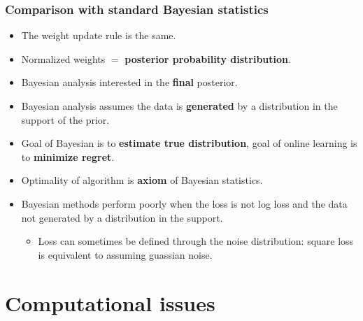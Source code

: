 \documentclass[handout]{beamer}
\begin{document}
\begin{frame}
\frametitle{Comparison with standard Bayesian statistics}
\begin{itemize}
\item The weight update rule is the same.
\item Normalized weights $=$ {\bf posterior probability  distribution}.
\item Bayesian analysis interested in the {\bf final} posterior.
\item Bayesian analysis assumes the data is {\bf generated} 
by a distribution in the support of the prior.
\item Goal of Bayesian is to {\bf estimate true distribution}, 
goal of online learning is to {\bf minimize regret}.
\item Optimality of algorithm is {\bf axiom} of Bayesian statistics.
\item Bayesian methods perform poorly when the loss is not log loss
  and the data not generated by a distribution in the support.
\begin{itemize}
\item
Loss can sometimes be defined through the noise distribution: square loss is equivalent to assuming guassian noise.
\end{itemize}
\end{itemize}
\end{frame}


\section{Computational issues}
\end{document}
